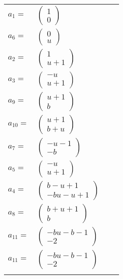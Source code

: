 \documentclass[1p]{elsarticle_modified}
\theoremstyle{definition}
\begin{document}
\begin{tabular}{m{7pt} m{180pt} m{7pt} m{180pt} }
\flushright $a_{1}=$&$\begin{pmatrix}1\\0\end{pmatrix}$ \\
\flushright $a_{6}=$&$\begin{pmatrix}0\\u\end{pmatrix}$ \\
\flushright $a_{2}=$&$\begin{pmatrix}1\\u+1\end{pmatrix}$ \\
\flushright $a_{3}=$&$\begin{pmatrix}- u\\u+1\end{pmatrix}$ \\
\flushright $a_{9}=$&$\begin{pmatrix}u+1\\b\end{pmatrix}$ \\
\flushright $a_{10}=$&$\begin{pmatrix}u+1\\b+u\end{pmatrix}$ \\
\flushright $a_{7}=$&$\begin{pmatrix}- u-1\\- b\end{pmatrix}$ \\
\flushright $a_{5}=$&$\begin{pmatrix}- u\\u+1\end{pmatrix}$ \\
\flushright $a_{4}=$&$\begin{pmatrix}b- u+1\\- b u- u+1\end{pmatrix}$ \\
\flushright $a_{8}=$&$\begin{pmatrix}b+u+1\\b\end{pmatrix}$ \\
\flushright $a_{11}=$&$\begin{pmatrix}- b u- b-1\\-2\end{pmatrix}$\\ \flushright $a_{11}=$&$\begin{pmatrix}- b u- b-1\\-2\end{pmatrix}$\\&\end{tabular}
\end{document}
